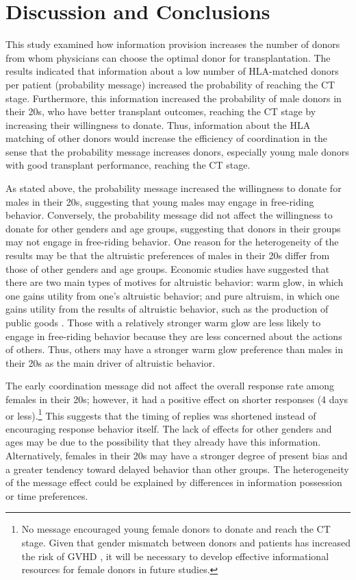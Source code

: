 \documentclass[12pt, a4paper]{article}
\begin{document}
\hypertarget{conclusion}{%
\section{Discussion and Conclusions}\label{conclusion}}

This study examined how information provision increases the number of donors from whom physicians can choose the optimal donor for transplantation. The results indicated that information about a low number of HLA-matched donors per patient (probability message) increased the probability of reaching the CT stage. Furthermore, this information increased the probability of male donors in their 20s, who have better transplant outcomes, reaching the CT stage by increasing their willingness to donate. Thus, information about the HLA matching of other donors would increase the efficiency of coordination in the sense that the probability message increases donors, especially young male donors with good transplant performance, reaching the CT stage.

As stated above, the probability message increased the willingness to donate for males in their 20s, suggesting that young males may engage in free-riding behavior. Conversely, the probability message did not affect the willingness to donate for other genders and age groups, suggesting that donors in their groups may not engage in free-riding behavior. One reason for the heterogeneity of the results may be that the altruistic preferences of males in their 20s differ from those of other genders and age groups. Economic studies have suggested that there are two main types of motives for altruistic behavior: warm glow, in which one gains utility from one's altruistic behavior; and pure altruism, in which one gains utility from the results of altruistic behavior, such as the production of public goods \citep[e.g.,][]{Andreoni1990}. Those with a relatively stronger warm glow are less likely to engage in free-riding behavior because they are less concerned about the actions of others. Thus, others may have a stronger warm glow preference than males in their 20s as the main driver of altruistic behavior.

The early coordination message did not affect the overall response rate among females in their 20s; however, it had a positive effect on shorter responses (4 days or less).\footnote{No message encouraged young female donors to donate and reach the CT stage. Given that gender mismatch between donors and patients has increased the risk of GVHD \citep{Loren2006, Nannya2011}, it will be necessary to develop effective informational resources for female donors in future studies.} This suggests that the timing of replies was shortened instead of encouraging response behavior itself. The lack of effects for other genders and ages may be due to the possibility that they already have this information. Alternatively, females in their 20s may have a stronger degree of present bias and a greater tendency toward delayed behavior than other groups. The heterogeneity of the message effect could be explained by differences in information possession or time preferences.
\end{document}
